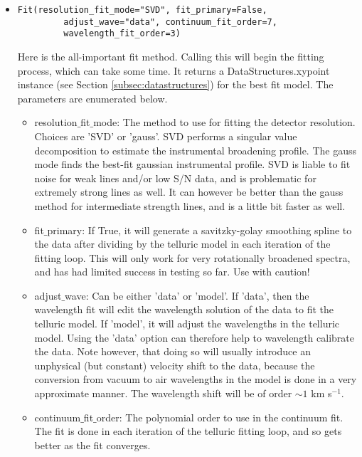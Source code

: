 \documentclass{article}
\begin{document}
\begin{itemize}
  \item \begin{Verbatim}[commandchars=\\\{\}]
Fit(resolution_fit_mode="SVD", fit_primary=False,
         adjust_wave="data", continuum_fit_order=7, 
         wavelength_fit_order=3)
    \end{Verbatim}
    Here is the all-important fit method. Calling this will begin the fitting process, which can take some time. It returns a DataStructures.xypoint instance (see Section \ref{subsec:datastructures}) for the best fit model. The parameters are enumerated below.
    
    \begin{itemize}
    
      \item resolution$\_$fit$\_$mode: The method to use for fitting the detector resolution. Choices are 'SVD' or 'gauss'. SVD performs a singular value decomposition to estimate the instrumental broadening profile. The gauss mode finds the best-fit gaussian instrumental profile. SVD is liable to fit noise for weak lines and/or low S/N data, and is problematic for extremely strong lines as well. It can however be better than the gauss method for intermediate strength lines, and is a little bit faster as well.
      
      \item fit$\_$primary: If True, it will generate a savitzky-golay smoothing spline to the data after dividing by the telluric model in each iteration of the fitting loop. This will only work for very rotationally broadened spectra, and has had limited success in testing so far. Use with caution!
      
      \item adjust$\_$wave: Can be either 'data' or 'model'. If 'data', then the wavelength fit will edit the wavelength solution of the data to fit the telluric model. If 'model', it will adjust the wavelengths in the telluric model. Using the 'data' option can therefore help to wavelength calibrate the data. Note however, that doing so will usually introduce an unphysical (but constant) velocity shift to the data, because the conversion from vacuum to air wavelengths in the model is done in a very approximate manner. The wavelength shift will be of order $\sim 1$ km s$^{-1}$.
      
      \item continuum$\_$fit$\_$order: The polynomial order to use in the continuum fit. The fit is done in each iteration of the telluric fitting loop, and so gets better as the fit converges.
      

\end{itemize}
\end{itemize}
\end{document}

